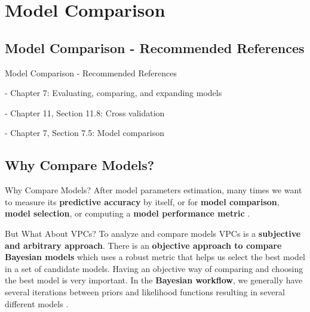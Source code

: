 
\section{Model Comparison}

\subsection{Model Comparison - Recommended References}
\begin{frame}{Model Comparison - Recommended References}
	\begin{vfilleditems}
		\item \textcite{gelman2013bayesian} - Chapter 7: Evaluating, comparing, and expanding models
		\item \textcite{gelman2020regression} - Chapter 11, Section 11.8: Cross validation
		\item \textcite{mcelreath2020statistical} - Chapter 7, Section 7.5: Model comparison
		\item \textcite{vehtariPracticalBayesianModel2015}
		\item \textcite{spiegelhalter2002bayesian}
		\item \textcite{van2005dic}
		\item \textcite{watanabe2010asymptotic}
		\item \textcite{gelfand1996model}
		\item \textcite{watanabe2010asymptotic}
		\item \textcite{geisser1979predictive}
	\end{vfilleditems}
\end{frame}

\subsection{Why Compare Models?}
\begin{frame}{Why Compare Models?}
	After model parameters estimation,
	many times we want to measure its \textbf{predictive accuracy} by itself,
	or for \textbf{model comparison}, \textbf{model selection}, or computing a \textbf{model performance metric}
	\parencite{geisser1979predictive}.
\end{frame}

\begin{frame}{But What About VPCs?}
	To analyze and compare models VPCs is a
	\textbf{subjective and arbitrary approach}.
	\vfill
	There is an \textbf{objective approach to compare Bayesian models}
	which uses a robust metric that helps us
	select the best model in a set of candidate models.
	\vfill
	Having an objective way of comparing and choosing the best model is very important.
	In the \textbf{Bayesian workflow},
	we generally have several iterations between priors and likelihood functions
	resulting in several different models \parencite{gelmanBayesianWorkflow2020}.
\end{frame}

